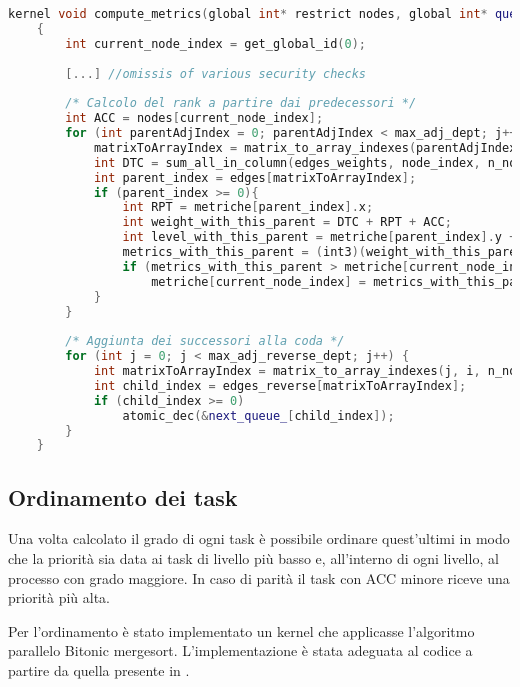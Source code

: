 \begin{lstlisting}[language=C++, caption={compute\_metrics kernel},captionpos=b]
	kernel void compute_metrics(global int* restrict nodes, global int* queue_, global int* next_queue_, global edge_t* restrict edges, global edge_t* restrict edges_reverse, global edge_t* restrict edges_weights, volatile global metrics_tt* metriche, const int max_adj_dept, const int max_adj_reverse_dept, const int n_nodes)
	{
		int current_node_index = get_global_id(0);
		
		[...] //omissis of various security checks
		
		/* Calcolo del rank a partire dai predecessori */
		int ACC = nodes[current_node_index];
		for (int parentAdjIndex = 0; parentAdjIndex < max_adj_dept; j++) {
			matrixToArrayIndex = matrix_to_array_indexes(parentAdjIndex, current_node_index, n_nodes);
			int DTC = sum_all_in_column(edges_weights, node_index, n_nodes);
			int parent_index = edges[matrixToArrayIndex];
			if (parent_index >= 0){
				int RPT = metriche[parent_index].x;
				int weight_with_this_parent = DTC + RPT + ACC;
				int level_with_this_parent = metriche[parent_index].y + 1;
				metrics_with_this_parent = (int3)(weight_with_this_parent, level_with_this_parent, current_node_index);
				if (metrics_with_this_parent > metriche[current_node_index])
					metriche[current_node_index] = metrics_with_this_parent;
			}
		}
	
		/* Aggiunta dei successori alla coda */
		for (int j = 0; j < max_adj_reverse_dept; j++) {
			int matrixToArrayIndex = matrix_to_array_indexes(j, i, n_nodes);
			int child_index = edges_reverse[matrixToArrayIndex];
			if (child_index >= 0)
				atomic_dec(&next_queue_[child_index]);	
		}
	}
\end{lstlisting}

\subsection{Ordinamento dei task}
Una volta calcolato il grado di ogni task è possibile ordinare quest'ultimi in modo che la priorità sia data ai task di livello più basso e, all'interno di ogni livello, al processo con grado maggiore.
In caso di parità il task con ACC minore riceve una priorità più alta.

Per l'ordinamento è stato implementato un kernel che applicasse l'algoritmo parallelo Bitonic mergesort. L'implementazione è stata adeguata al codice a partire da quella presente in \cite{parallelsort}.

